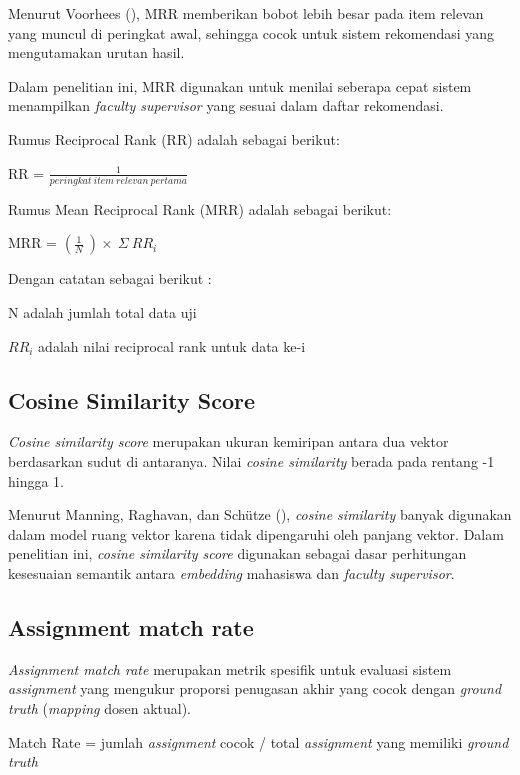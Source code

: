 Menurut Voorhees (\citeyear{voorhees1999mrr}), MRR memberikan bobot lebih besar pada item relevan yang muncul di peringkat awal, sehingga cocok untuk sistem rekomendasi yang mengutamakan urutan hasil.

Dalam penelitian ini, MRR digunakan untuk menilai seberapa cepat sistem menampilkan \textit{faculty supervisor} yang sesuai dalam daftar rekomendasi.

Rumus Reciprocal Rank (RR) adalah sebagai berikut:

RR = \(\frac{1}{peringkat\ item\ relevan\ pertama}\)

Rumus Mean Reciprocal Rank (MRR) adalah sebagai berikut:

MRR = \((\frac{1}{N}\ ) \times \ \Sigma\ RR_i\)

Dengan catatan sebagai berikut :

N adalah jumlah total data uji

$RR_i$ adalah nilai reciprocal rank untuk data ke-i

\subsection{Cosine Similarity Score}\label{cosine-similarity-score}

\textit{Cosine similarity score} merupakan ukuran kemiripan antara dua vektor berdasarkan sudut di antaranya. Nilai \textit{cosine similarity} berada pada rentang -1 hingga 1.

Menurut Manning, Raghavan, dan Schütze (\citeyear{manning2008ir}), \textit{cosine similarity} banyak digunakan dalam model ruang vektor karena tidak dipengaruhi oleh panjang vektor. Dalam penelitian ini, \textit{cosine similarity score} digunakan sebagai dasar perhitungan kesesuaian semantik antara \textit{embedding} mahasiswa dan \textit{faculty supervisor}.

\subsection{Assignment match rate}\label{assignment-match-rate}

\textit{Assignment match rate} merupakan metrik spesifik untuk evaluasi sistem \textit{assignment} yang mengukur proporsi penugasan akhir yang cocok dengan \textit{ground truth} (\textit{mapping} dosen aktual).

Match Rate = jumlah \textit{assignment} cocok / total \textit{assignment} yang memiliki \textit{ground truth}

